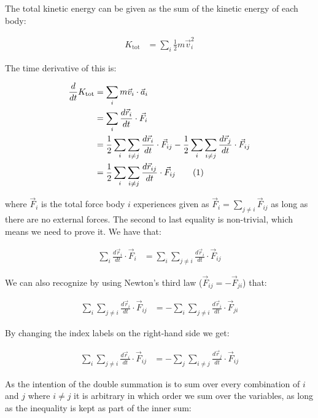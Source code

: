 \documentclass[reprint,english,notitlepage]{revtex4-1}  %
\newcommand\numberthis{\addtocounter{equation}{1}\tag{\theequation}}
\begin{document}
The total kinetic energy can be given as the sum of the kinetic energy of each body:

\begin{align*}
K_\text{tot} &= \sum\limits_i \frac{1}{2} m \vec{v}_i^2 
\end{align*}

The time derivative of this is:

\begin{align*}
\frac{d}{dt} K_\text{tot} &= \sum\limits_i m \vec{v}_i \cdot \vec{a}_i \\
&= \sum\limits_i \frac{d\vec{r}_i}{dt} \cdot \vec{F}_i \\
&= \frac{1}{2}\sum\limits_i \sum\limits_{i\neq j} \frac{d\vec{r}_i}{dt} \cdot \vec{F}_{ij} - \frac{1}{2}\sum\limits_i \sum\limits_{i\neq j} \frac{d\vec{r}_j}{dt} \cdot \vec{F}_{ij} \\
&= \frac{1}{2}\sum\limits_i \sum\limits_{i\neq j} \frac{d\vec{r}_{ij}}{dt} \cdot \vec{F}_{ij} \numberthis \label{eq:kin_en_der1}
\end{align*}


where $\vec{F}_i$ is the total force body $i$ experiences given as $\vec{F}_i = \sum\limits_{j\neq i} \vec{F}_{ij}$ as long as there are no external forces. The second to last equality is non-trivial, which means we need to prove it. We have that:

\begin{align*}
\sum\limits_i \frac{d\vec{r}_i}{dt} \cdot \vec{F}_i &= \sum\limits_i \sum\limits_{j \neq i} \frac{d\vec{r}_i}{dt} \cdot \vec{F}_{ij} 
\end{align*}

We can also recognize by using Newton's third law ($\vec{F}_{ij} = - \vec{F}_{ji}$) that:

\begin{align*}
\sum\limits_i \sum\limits_{j \neq i} \frac{d\vec{r}_i}{dt} \cdot \vec{F}_{ij} &= -\sum\limits_i \sum\limits_{j \neq i} \frac{d\vec{r}_i}{dt} \cdot \vec{F}_{ji} 
\end{align*}

By changing the index labels on the right-hand side we get:

\begin{align*}
\sum\limits_i \sum\limits_{j \neq i} \frac{d\vec{r}_i}{dt} \cdot \vec{F}_{ij} &= -\sum\limits_j \sum\limits_{i \neq j} \frac{d\vec{r}_j}{dt} \cdot \vec{F}_{ij} 
\end{align*}

As the intention of the double summation is to sum over every combination of $i$ and $j$ where $i\neq j$ it is arbitrary in which order we sum over the variables, as long as the inequality is kept as part of the inner sum:
\end{document}
